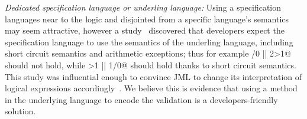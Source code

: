 \noindent\textit{Dedicated specification language or underling language:}
Using a specification languages near to the logic and disjointed from a specific language's
semantics may seem attractive, however
a study~\cite{chalin2007logical} discovered that developers expect
the specification language to use the semantics of the underling language, including
short circuit semantics and arithmetic exceptions; thus for example
/0 || 2>1@
should not hold, while 
>1 || 1/0@ should hold thanks to short circuit semantics.
This study was influential enough to convince JML to change its interpretation of logical expressions
accordingly~\cite{chalin2008jml}.
We believe this is evidence that using a method in the underlying language to encode the validation is
a developers-friendly solution.












